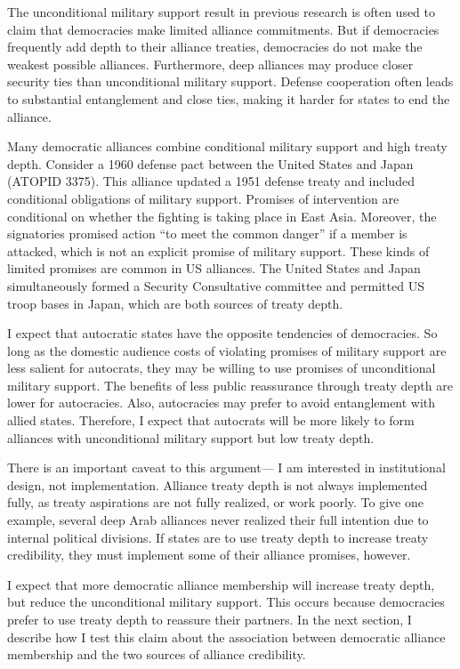 \documentclass[12pt]{article}
\begin{document}
The unconditional military support result in previous research is often used to claim that democracies make limited alliance commitments. 
But if democracies frequently add depth to their alliance treaties, democracies do not make the weakest possible alliances. 
Furthermore, deep alliances may produce closer security ties than unconditional military support. 
Defense cooperation often leads to substantial entanglement and close ties, making it harder for states to end the alliance. 


Many democratic alliances combine conditional military support and high treaty depth. 
Consider a 1960 defense pact between the United States and Japan (ATOPID 3375).
This alliance updated a 1951 defense treaty and included conditional obligations of military support. 
Promises of intervention are conditional on whether the fighting is taking place in East Asia. 
Moreover, the signatories promised action ``to meet the common danger'' if a member is attacked, which is not an explicit promise of military support. 
These kinds of limited promises are common in US alliances. 
The United States and Japan simultaneously formed a Security Consultative committee and permitted US troop bases in Japan, which are both sources of treaty depth. 


I expect that autocratic states have the opposite tendencies of democracies.
So long as the domestic audience costs of violating promises of military support are less salient for autocrats, they may be willing to use promises of unconditional military support. 
The benefits of less public reassurance through treaty depth are lower for autocracies. 
Also, autocracies may prefer to avoid entanglement with allied states. 
Therefore, I expect that autocrats will be more likely to form alliances with unconditional military support but low treaty depth. 


There is an important caveat to this argument--- I am interested in institutional design, not implementation.
Alliance treaty depth is not always implemented fully, as treaty aspirations are not fully realized, or work poorly. 
To give one example, several deep Arab alliances never realized their full intention due to internal political divisions.  
If states are to use treaty depth to increase treaty credibility, they must implement some of their alliance promises, however. 


I expect that more democratic alliance membership will increase treaty depth, but reduce the unconditional military support.  
This occurs because democracies prefer to use treaty depth to reassure their partners. 
In the next section, I describe how I test this claim about the association between democratic alliance membership and the two sources of alliance credibility. 
\end{document}
